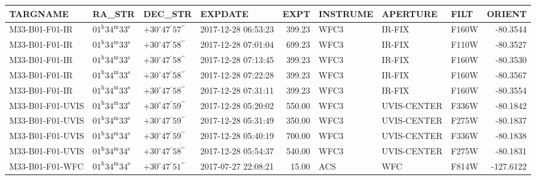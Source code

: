 \begin{tabular}{llllrlllr}
\toprule
         TARGNAME &                                     RA_STR &                                    DEC_STR &              EXPDATE &    EXPT & INSTRUME &     APERTURE &   FILT &    ORIENT \\
\midrule
   M33-B01-F01-IR &  $01^\mathrm{h}34^\mathrm{m}33^\mathrm{s}$ &  $+30^\circ47{}^\prime57{}^{\prime\prime}$ &  2017-12-28 06:53:23 &  399.23 &     WFC3 &       IR-FIX &  F160W &  -80.3544 \\
   M33-B01-F01-IR &  $01^\mathrm{h}34^\mathrm{m}33^\mathrm{s}$ &  $+30^\circ47{}^\prime58{}^{\prime\prime}$ &  2017-12-28 07:01:04 &  699.23 &     WFC3 &       IR-FIX &  F110W &  -80.3527 \\
   M33-B01-F01-IR &  $01^\mathrm{h}34^\mathrm{m}33^\mathrm{s}$ &  $+30^\circ47{}^\prime58{}^{\prime\prime}$ &  2017-12-28 07:13:45 &  399.23 &     WFC3 &       IR-FIX &  F160W &  -80.3530 \\
   M33-B01-F01-IR &  $01^\mathrm{h}34^\mathrm{m}33^\mathrm{s}$ &  $+30^\circ47{}^\prime58{}^{\prime\prime}$ &  2017-12-28 07:22:28 &  399.23 &     WFC3 &       IR-FIX &  F160W &  -80.3567 \\
   M33-B01-F01-IR &  $01^\mathrm{h}34^\mathrm{m}33^\mathrm{s}$ &  $+30^\circ47{}^\prime58{}^{\prime\prime}$ &  2017-12-28 07:31:11 &  399.23 &     WFC3 &       IR-FIX &  F160W &  -80.3554 \\
 M33-B01-F01-UVIS &  $01^\mathrm{h}34^\mathrm{m}33^\mathrm{s}$ &  $+30^\circ47{}^\prime59{}^{\prime\prime}$ &  2017-12-28 05:20:02 &  550.00 &     WFC3 &  UVIS-CENTER &  F336W &  -80.1842 \\
 M33-B01-F01-UVIS &  $01^\mathrm{h}34^\mathrm{m}33^\mathrm{s}$ &  $+30^\circ47{}^\prime59{}^{\prime\prime}$ &  2017-12-28 05:31:49 &  350.00 &     WFC3 &  UVIS-CENTER &  F275W &  -80.1837 \\
 M33-B01-F01-UVIS &  $01^\mathrm{h}34^\mathrm{m}34^\mathrm{s}$ &  $+30^\circ47{}^\prime59{}^{\prime\prime}$ &  2017-12-28 05:40:19 &  700.00 &     WFC3 &  UVIS-CENTER &  F336W &  -80.1838 \\
 M33-B01-F01-UVIS &  $01^\mathrm{h}34^\mathrm{m}34^\mathrm{s}$ &  $+30^\circ47{}^\prime58{}^{\prime\prime}$ &  2017-12-28 05:54:37 &  540.00 &     WFC3 &  UVIS-CENTER &  F275W &  -80.1831 \\
  M33-B01-F01-WFC &  $01^\mathrm{h}34^\mathrm{m}34^\mathrm{s}$ &  $+30^\circ47{}^\prime51{}^{\prime\prime}$ &  2017-07-27 22:08:21 &   15.00 &      ACS &          WFC &  F814W & -127.6122 \\

\end{tabular}
